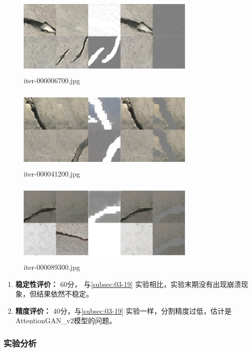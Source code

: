 \begin{figure}[H]
	\centering
	\includegraphics[width=240pt,height=110pt]{0319//iter-000006700}
	\caption{iter-000006700.jpg}
\end{figure}
\begin{figure}[H]
	\centering
	\includegraphics[width=240pt,height=110pt]{0319//iter-000041200}
	\caption{iter-000041200.jpg}
\end{figure}
\begin{figure}[H]
	\centering
	\includegraphics[width=240pt,height=110pt]{0319//iter-000089300}
	\caption{iter-000089300.jpg}
\end{figure}

\begin{enumerate}[1.]
	\item \textbf{稳定性评价：} 60分， 与\ref{subsec:03-19} 实验相比，实验末期没有出现崩溃现象，但结果依然不稳定。
	\item \textbf{精度评价：} 40分，与\ref{subsec:03-19} 实验一样，分割精度过低，估计是AttentionGAN\_v2模型的问题。
\end{enumerate}


\subsubsection{实验分析}

